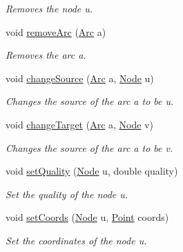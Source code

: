 \begin{DoxyCompactItemize}
\begin{DoxyCompactList}\small\item\em Removes the node u. \end{DoxyCompactList}\item 
void \hyperlink{class_landscape_ada96d1d07c462e043133440f647211b2}{remove\+Arc} (\hyperlink{classconcepts_1_1_abstract_landscape_a0966623f028fe50ac9a3ae114dcf2672}{Arc} a)
\begin{DoxyCompactList}\small\item\em Removes the arc a. \end{DoxyCompactList}\item 
void \hyperlink{class_landscape_ae176491eae8fec5777ab8566cc8bf64f}{change\+Source} (\hyperlink{classconcepts_1_1_abstract_landscape_a0966623f028fe50ac9a3ae114dcf2672}{Arc} a, \hyperlink{classconcepts_1_1_abstract_landscape_a7c2f90fb9f42302f1af84a59f4df4b91}{Node} u)
\begin{DoxyCompactList}\small\item\em Changes the source of the arc a to be u. \end{DoxyCompactList}\item 
void \hyperlink{class_landscape_a4bbe12577926a357f715d8e91c393ec4}{change\+Target} (\hyperlink{classconcepts_1_1_abstract_landscape_a0966623f028fe50ac9a3ae114dcf2672}{Arc} a, \hyperlink{classconcepts_1_1_abstract_landscape_a7c2f90fb9f42302f1af84a59f4df4b91}{Node} v)
\begin{DoxyCompactList}\small\item\em Changes the source of the arc a to be v. \end{DoxyCompactList}\item 
void \hyperlink{class_landscape_aac673fb693ff152251109c07f60f3672}{set\+Quality} (\hyperlink{classconcepts_1_1_abstract_landscape_a7c2f90fb9f42302f1af84a59f4df4b91}{Node} u, double quality)
\begin{DoxyCompactList}\small\item\em Set the quality of the node u. \end{DoxyCompactList}\item 
void \hyperlink{class_landscape_a4c8df159a4754013dd381bfff23d133d}{set\+Coords} (\hyperlink{classconcepts_1_1_abstract_landscape_a7c2f90fb9f42302f1af84a59f4df4b91}{Node} u, \hyperlink{abstract__landscape_8hpp_a9c14bcba65b035519a9c98f1eb1babbe}{Point} coords)
\begin{DoxyCompactList}\small\item\em Set the coordinates of the node u. \end{DoxyCompactList}\item 

\end{DoxyCompactItemize}
